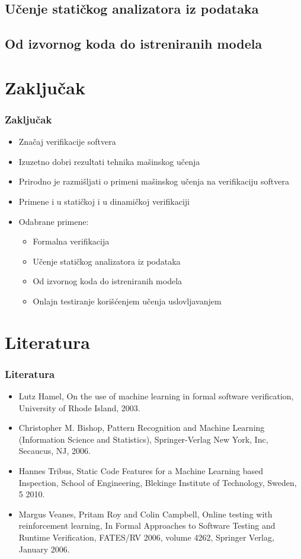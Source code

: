\documentclass[11pt]{beamer}
\theoremstyle{definition}
\begin{document}
{\begin{frame}
\end{frame}


\subsection{Učenje statičkog analizatora iz podataka}
\label{subsec:staticki-analizator}

\subsection{Od izvornog koda do istreniranih modela}
\label{subsec:pregled}

\section{Zaključak}
\label{sec:zakljucak}
\begin{frame}
\frametitle{Zaključak}
\begin{itemize}
\item Značaj verifikacije softvera
\item Izuzetno dobri rezultati tehnika mašinskog učenja
\item Prirodno je razmišljati o primeni mašinskog učenja na verifikaciju softvera
\item Primene i u statičkoj i u dinamičkoj verifikaciji
\item Odabrane primene:
	\begin{itemize}
		\item Formalna verifikacija
		\item Učenje statičkog analizatora iz podataka
		\item Od izvornog koda do istreniranih modela
		\item Onlajn testiranje korišćenjem učenja uslovljavanjem
	\end{itemize}
\end{itemize}
\end{frame}

\section{Literatura}
\begin{frame}
\frametitle{Literatura}
\begin{itemize}
\item Lutz Hamel, On the use of machine learning in formal software verification, University of Rhode Island, 2003.
\item Christopher M. Bishop, Pattern Recognition and Machine Learning (Information Science and Statistics), Springer-Verlag New York, Inc, Secaucus, NJ, 2006.
\item Hannes Tribus, Static Code Features for a Machine Learning based Inspection, School of Engineering, Blekinge Institute of Technology, Sweden, 5 2010.
\item Margus Veanes, Pritam Roy and Colin Campbell, Online testing with reinforcement learning, In Formal Approaches to Software Testing and Runtime Verification, FATES/RV 2006, volume 4262, Springer Verlag, January 2006.
\end{itemize}
\end{frame}

}
\end{document}
